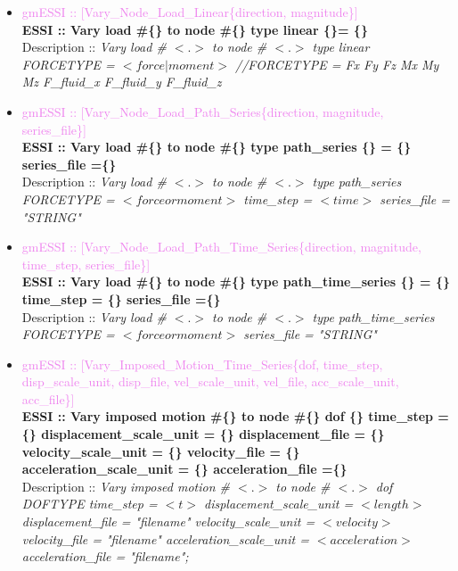 \documentclass[11pt]{article}
\begin{document}
\begin{itemize}
  \item \textcolor{violet}{ gmESSI :: [Vary\_Node\_Load\_Linear\{direction, magnitude\}]}\\
  \textbf{ ESSI :: Vary load \#\{\} to node \#\{\} type linear \{\}= \{\} }\\
  Description :: \textit{Vary load \# $<.>$ to node \# $<.>$ type linear FORCETYPE = $<force|moment>$ //FORCETYPE = Fx Fy Fz Mx My Mz F\_fluid\_x F\_fluid\_y F\_fluid\_z}

  \item \textcolor{violet}{ gmESSI :: [Vary\_Node\_Load\_Path\_Series\{direction, magnitude, series\_file\}]}\\
  \textbf{ ESSI :: Vary load \#\{\} to node \#\{\} type path\_series \{\} = \{\} series\_file =\{\}}\\
  Description :: \textit{Vary load \# $<.>$ to node \# $<.>$ type path\_series FORCETYPE = $<force or moment>$ time\_step = $<time>$ series\_file = "STRING"}

  \item \textcolor{violet}{ gmESSI :: [Vary\_Node\_Load\_Path\_Time\_Series\{direction, magnitude, time\_step, series\_file\}]}\\
  \textbf{ ESSI :: Vary load \#\{\} to node \#\{\} type path\_time\_series \{\} = \{\} time\_step = \{\} series\_file =\{\}}\\
  Description :: \textit{Vary load \# $<.>$ to node \# $<.>$ type path\_time\_series FORCETYPE = $<force or moment>$ series\_file = "STRING"}

  \item \textcolor{violet}{ gmESSI :: [Vary\_Imposed\_Motion\_Time\_Series\{dof, time\_step, disp\_scale\_unit, disp\_file, vel\_scale\_unit, vel\_file, acc\_scale\_unit, acc\_file\}]}\\
  \textbf{ ESSI :: Vary imposed motion \#\{\} to node \#\{\} dof \{\} time\_step = \{\} displacement\_scale\_unit = \{\} displacement\_file = \{\} velocity\_scale\_unit = \{\} velocity\_file = \{\} acceleration\_scale\_unit = \{\} acceleration\_file =\{\}}\\
  Description :: \textit{Vary imposed motion \# $<.>$ to node \# $<.>$ dof DOFTYPE time\_step = $<t>$ displacement\_scale\_unit = $<length>$ displacement\_file = "filename" velocity\_scale\_unit = $<velocity>$ velocity\_file = "filename" acceleration\_scale\_unit = $<acceleration>$ acceleration\_file = "filename";}


\end{itemize}
\end{document}
